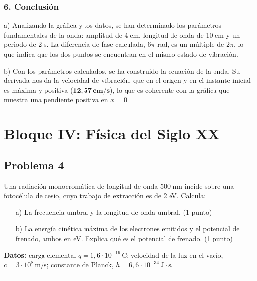 \subsubsection*{6. Conclusión}
\begin{cajaconclusion}
a) Analizando la gráfica y los datos, se han determinado los parámetros fundamentales de la onda: amplitud de 4 cm, longitud de onda de 10 cm y un periodo de 2 s. La diferencia de fase calculada, $6\pi$ rad, es un múltiplo de $2\pi$, lo que indica que los dos puntos se encuentran en el mismo estado de vibración.

b) Con los parámetros calculados, se ha construido la ecuación de la onda. Su derivada nos da la velocidad de vibración, que en el origen y en el instante inicial es máxima y positiva ($\mathbf{12,57\,cm/s}$), lo que es coherente con la gráfica que muestra una pendiente positiva en $x=0$.
\end{cajaconclusion}

\newpage

\section{Bloque IV: Física del Siglo XX}
\label{sec:fisXX_2020_sep_ext}

\subsection{Problema 4}
\label{subsec:P4_2020_sep_ext}

\begin{cajaenunciado}
Una radiación monocromática de longitud de onda 500 nm incide sobre una fotocélula de cesio, cuyo trabajo de extracción es de 2 eV. Calcula:
\begin{enumerate}
    \item[a)] La frecuencia umbral y la longitud de onda umbral. (1 punto)
    \item[b)] La energía cinética máxima de los electrones emitidos y el potencial de frenado, ambos en eV. Explica qué es el potencial de frenado. (1 punto)
\end{enumerate}
\textbf{Datos:} carga elemental $q=1,6\cdot10^{-19}\,\text{C}$; velocidad de la luz en el vacío, $c=3\cdot10^{8}\,\text{m/s}$; constante de Planck, $h=6,6\cdot10^{-34}\,\text{J}\cdot\text{s}$.
\end{cajaenunciado}
\hrule

